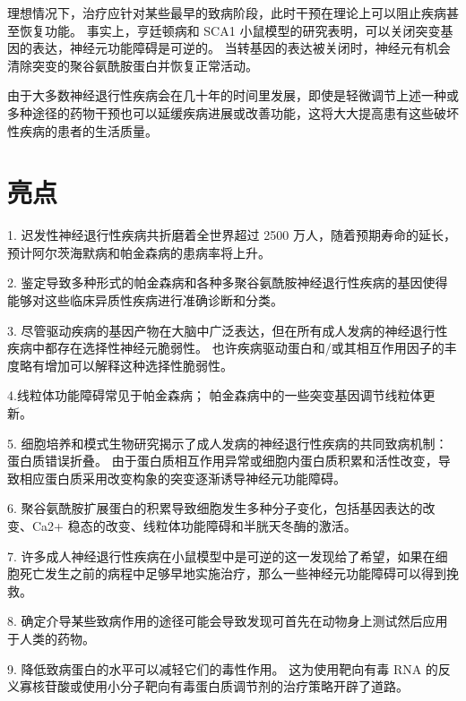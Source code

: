 理想情况下，治疗应针对某些最早的致病阶段，此时干预在理论上可以阻止疾病甚至恢复功能。
事实上，亨廷顿病和 SCA1 小鼠模型的研究表明，可以关闭突变基因的表达，神经元功能障碍是可逆的。
当转基因的表达被关闭时，神经元有机会清除突变的聚谷氨酰胺蛋白并恢复正常活动。


由于大多数神经退行性疾病会在几十年的时间里发展，即使是轻微调节上述一种或多种途径的药物干预也可以延缓疾病进展或改善功能，这将大大提高患有这些破坏性疾病的患者的生活质量。



\section{亮点}

1. 迟发性神经退行性疾病共折磨着全世界超过 2500 万人，随着预期寿命的延长，预计阿尔茨海默病和帕金森病的患病率将上升。 


2. 鉴定导致多种形式的帕金森病和各种多聚谷氨酰胺神经退行性疾病的基因使得能够对这些临床异质性疾病进行准确诊断和分类。


3. 尽管驱动疾病的基因产物在大脑中广泛表达，但在所有成人发病的神经退行性疾病中都存在选择性神经元脆弱性。
也许疾病驱动蛋白和/或其相互作用因子的丰度略有增加可以解释这种选择性脆弱性。


4.线粒体功能障碍常见于帕金森病；
帕金森病中的一些突变基因调节线粒体更新。


5. 细胞培养和模式生物研究揭示了成人发病的神经退行性疾病的共同致病机制：蛋白质错误折叠。
由于蛋白质相互作用异常或细胞内蛋白质积累和活性改变，导致相应蛋白质采用改变构象的突变逐渐诱导神经元功能障碍。


6. 聚谷氨酰胺扩展蛋白的积累导致细胞发生多种分子变化，包括基因表达的改变、Ca2+ 稳态的改变、线粒体功能障碍和半胱天冬酶的激活。


7. 许多成人神经退行性疾病在小鼠模型中是可逆的这一发现给了希望，如果在细胞死亡发生之前的病程中足够早地实施治疗，那么一些神经元功能障碍可以得到挽救。


8. 确定介导某些致病作用的途径可能会导致发现可首先在动物身上测试然后应用于人类的药物。


9. 降低致病蛋白的水平可以减轻它们的毒性作用。
这为使用靶向有毒 RNA 的反义寡核苷酸或使用小分子靶向有毒蛋白质调节剂的治疗策略开辟了道路。

